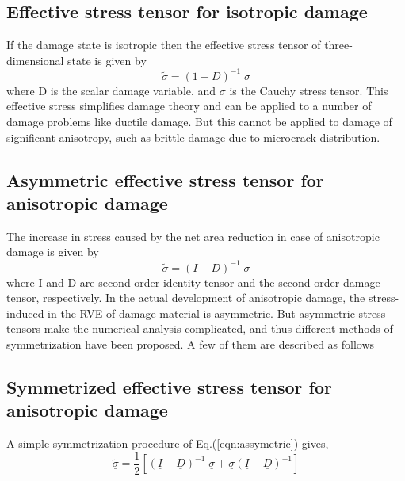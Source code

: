 \documentclass[12pt,a4paper,twoside,openright]{report}
\begin{document}
\subsection{Effective stress tensor for isotropic damage \citep{lemaitre1978aspect}}
\indent\indent\indent If the damage state is isotropic then the effective stress tensor of three-dimensional state is given by
\begin{equation}
 \underline{\tilde{\sigma}} = (1 - D)^{-1} \; \underline{\sigma}
\end{equation}
where D is the scalar damage variable, and $\sigma$ is the Cauchy stress tensor. This effective stress simplifies damage theory and can be applied to a number of damage problems like ductile damage. But this cannot be applied to damage of significant anisotropy, such as brittle damage due to microcrack distribution.\\
\subsection{Asymmetric effective stress tensor for anisotropic damage \citep{murakami2012continuum}}
\indent\indent\indent The increase in stress caused by the net area reduction in case of anisotropic damage is given by
\begin{equation}
\underline{\tilde{\sigma}} = (\underline{I} - \underline{D})^{-1} \; \underline{\sigma}
\label{eqn:assymetric}
\end{equation}
where I and D are second-order identity tensor and the second-order damage tensor, respectively. In the actual development of anisotropic damage, the stress-induced in the RVE of damage material is asymmetric. But asymmetric stress tensors make the numerical analysis complicated, and thus different methods of symmetrization have been proposed. A few of them are described as follows

\subsection{Symmetrized effective stress tensor for anisotropic damage \citep{murakami2012continuum}} 
\indent\indent\indent A simple symmetrization procedure of Eq.(\ref{eqn:assymetric}) gives,
\begin{equation}
\label{eqn: Murakami and Ohno}
\underline{\tilde{\sigma}} = \frac{1}{2} [(\underline{I} - \underline{D})^{-1}\;\underline{\sigma} + \underline{\sigma}(\underline{I} - \underline{D})^{-1}]
\end{equation}
\end{document}
